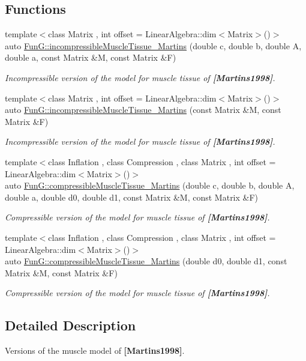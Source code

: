 \subsection*{Functions}
\begin{DoxyCompactItemize}
\item 
{\footnotesize template$<$class Matrix , int offset = Linear\+Algebra\+::dim$<$\+Matrix$>$()$>$ }\\auto \hyperlink{group__Biomechanics_gafcc36a1958899ca9246c4c1b3c9bfd85}{Fun\+G\+::incompressible\+Muscle\+Tissue\+\_\+\+Martins} (double c, double b, double A, double a, const Matrix \&M, const Matrix \&F)
\begin{DoxyCompactList}\small\item\em Incompressible version of the model for muscle tissue of {\bfseries [Martins1998]}. \end{DoxyCompactList}\item 
{\footnotesize template$<$class Matrix , int offset = Linear\+Algebra\+::dim$<$\+Matrix$>$()$>$ }\\auto \hyperlink{group__Biomechanics_ga9e414585a90b1988e9fa88d17d875055}{Fun\+G\+::incompressible\+Muscle\+Tissue\+\_\+\+Martins} (const Matrix \&M, const Matrix \&F)
\begin{DoxyCompactList}\small\item\em Incompressible version of the model for muscle tissue of {\bfseries [Martins1998]}. \end{DoxyCompactList}\item 
{\footnotesize template$<$class Inflation , class Compression , class Matrix , int offset = Linear\+Algebra\+::dim$<$\+Matrix$>$()$>$ }\\auto \hyperlink{group__Biomechanics_gad831914c493a3da04ed40c3c0ce87a62}{Fun\+G\+::compressible\+Muscle\+Tissue\+\_\+\+Martins} (double c, double b, double A, double a, double d0, double d1, const Matrix \&M, const Matrix \&F)
\begin{DoxyCompactList}\small\item\em Compressible version of the model for muscle tissue of {\bfseries [Martins1998]}. \end{DoxyCompactList}\item 
{\footnotesize template$<$class Inflation , class Compression , class Matrix , int offset = Linear\+Algebra\+::dim$<$\+Matrix$>$()$>$ }\\auto \hyperlink{group__Biomechanics_ga46a70ccb2285e12addad87b6a8aaaae8}{Fun\+G\+::compressible\+Muscle\+Tissue\+\_\+\+Martins} (double d0, double d1, const Matrix \&M, const Matrix \&F)
\begin{DoxyCompactList}\small\item\em Compressible version of the model for muscle tissue of {\bfseries [Martins1998]}. \end{DoxyCompactList}\end{DoxyCompactItemize}


\subsection{Detailed Description}
Versions of the muscle model of {\bfseries [Martins1998]}. 

